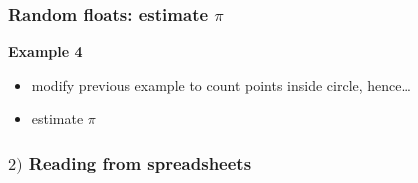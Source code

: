 \documentclass[english,14pt]{beamer}
\begin{document}

\begin{frame}[fragile]

\frametitle{Random floats: estimate $\pi$}

\textbf{Example 4}\\
\vspace*{5mm}
\begin{itemize}
	\item modify previous example to count points inside circle, hence\ldots
	\item estimate $\pi$
\end{itemize}

\end{frame}

%
%
%
%
%
%
%
%
%
%
%
%
%
%


\begin{frame}[fragile]

\frametitle{$2)$ Reading from spreadsheets}


\end{frame}
\end{document}
